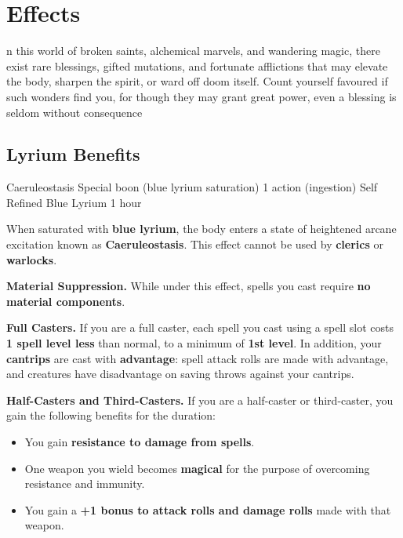 \section{Effects}

n this world of broken saints, alchemical marvels, and wandering magic, there exist rare blessings, gifted mutations, and fortunate afflictions that may elevate the body, sharpen the spirit, or ward off doom itself. Count yourself favoured if such wonders find you, for though they may grant great power, even a blessing is seldom without consequence

\subsection{Lyrium Benefits}

\DndSpellHeader%
  {Caeruleostasis}
  {Special boon (blue lyrium saturation)}
  {1 action (ingestion)}
  {Self}
  {Refined Blue Lyrium}
  {1 hour}

When saturated with \textbf{blue lyrium}, the body enters a state of heightened arcane excitation known as \textbf{Caeruleostasis}. This effect cannot be used by \textbf{clerics} or \textbf{warlocks}.

\textbf{Material Suppression.}  
While under this effect, spells you cast require \textbf{no material components}.

\textbf{Full Casters.}  
If you are a full caster, each spell you cast using a spell slot costs \textbf{1 spell level less} than normal, to a minimum of \textbf{1st level}. In addition, your \textbf{cantrips} are cast with \textbf{advantage}: spell attack rolls are made with advantage, and creatures have disadvantage on saving throws against your cantrips.

\textbf{Half-Casters and Third-Casters.}  
If you are a half-caster or third-caster, you gain the following benefits for the duration:

\begin{itemize}
\item You gain \textbf{resistance to damage from spells}.
\item One weapon you wield becomes \textbf{magical} for the purpose of overcoming resistance and immunity.
\item You gain a \textbf{+1 bonus to attack rolls and damage rolls} made with that weapon.
\end{itemize}

